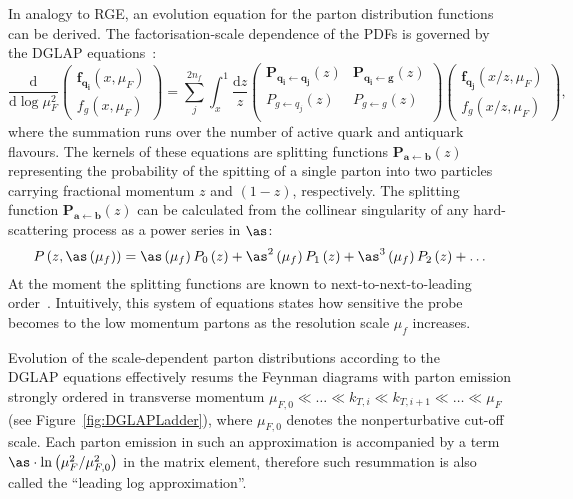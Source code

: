 In analogy to RGE, an evolution equation for the parton distribution functions can be derived. The factorisation-scale dependence of the PDFs is governed by the DGLAP equations~\cite{Altarelli:1977zs,Gribov:1972,Dokshitzer:1977,Balitsky:1978}:
\begin{equation}
\frac{\mathrm{d}}{\mathrm{d}\log{\mu_F^2}}
 \begin{pmatrix}
	\mathbf{f_{q_i}}\left(x,\mu_F\right) \\
	f_g\left(x,\mu_F\right)
 \end{pmatrix} = 
\sum_j^{2n_f}{\int_x^1{\frac{\mathrm{d}z}{z}
 \begin{pmatrix}
  \mathbf{P_{q_i \leftarrow q_j}}\left(z\right) & \mathbf{P_{q_i \leftarrow  g}}\left(z\right) \\
  P_{g \leftarrow q_j}\left(z\right) & P_{g \leftarrow g}\left(z\right) \\
 \end{pmatrix}
 \begin{pmatrix}
	\mathbf{f_{q_j}}\left(x/z,\mu_F\right) \\
	f_g\left(x/z,\mu_F\right)
 \end{pmatrix}
}},
\label{eq:dglap}
\end{equation}
where the summation runs over the number of active quark and antiquark flavours. The kernels of these equations are splitting functions $\mathbf{P_{a \leftarrow  b}}\left(z\right)$ representing the probability of the spitting of a single parton into two particles carrying fractional momentum $z$ and $\left(1-z\right)$, respectively. The splitting function $\mathbf{P_{a \leftarrow  b}}\left(z\right)$ can be calculated from the collinear singularity of any hard-scattering process as a power series in $\as$:
\begin{equation}
P\left(z,\as\left(\mu_f\right)\right) = \as\left(\mu_f\right) P_0\left(z\right) + \as^2\left(\mu_f\right)P_1\left(z\right) + \as^3\left(\mu_f\right)P_2\left(z\right) + \dots
\label{eq:splittingfunc}
\end{equation}
At the moment the splitting functions are known to next-to-next-to-leading order~\cite{Vogt:2004mw,Moch:2004pa}. Intuitively, this system of equations states how sensitive the probe becomes to the low momentum partons as the resolution scale $\mu_f$ increases. %

Evolution of the scale-dependent parton distributions according to the \\DGLAP equations effectively resums the Feynman diagrams with parton emission strongly ordered in transverse momentum $ \mu_{F,0} \ll \ldots \ll k_{T,i} \ll k_{T,i+1} \ll \ldots \ll \mu_F$ (see Figure~\ref{fig:DGLAPLadder}), where $\mu_{F,0}$ denotes the nonperturbative cut-off scale. Each parton emission in such an approximation is accompanied by a term $\as\cdot\ln{\left(\mu^2_F/\mu^2_{F,0}\right)}$ in the matrix element, therefore such resummation is also called the ``leading log approximation''.

